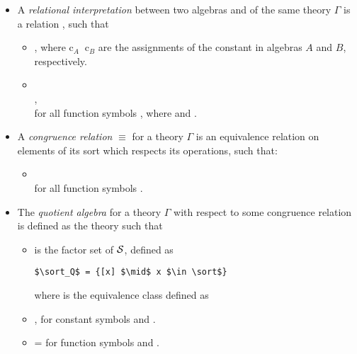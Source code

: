 \begin{itemize}
    \item A \emph{relational interpretation} between two algebras  and  of the same theory $\Gamma$ is a relation , such that 
    \begin{itemize}
    \item {}, where c$_A\ $ c$_B$ are the assignments of the constant  in algebras $A$ and $B$, respectively.  
    \item {} \\
    , \\
    for all function symbols , where  and . 
    \end{itemize}
    \item A \emph{congruence relation} $\equiv$ for a theory $\Gamma$ is an equivalence relation on elements of its sort which respects its operations, such that: 
    \begin{itemize}
    \item {}  \\
    for all function symbols . 
    \end{itemize}
    \item The \emph{quotient algebra} for a theory $\Gamma$ with respect to some congruence relation \lstmath{$\equiv$} is defined as the theory  such that 
    \begin{itemize}
       \item {} is the factor set of $\mathcal{S}$, defined as 
       	\begin{lstlisting}[mathescape]
       	$\sort_Q$ = {[x] $\mid$ x $\in \sort$}
       	\end{lstlisting} 
       	where \lstmath{[x]} is the equivalence class defined as 
       \item {}, for constant symbols  and .  
       \item {} = \lstmath{[f x$_1$ $\ \cdots\ $ x$_n$]}
       for function symbols  and .
    \end{itemize}      


\end{itemize}
